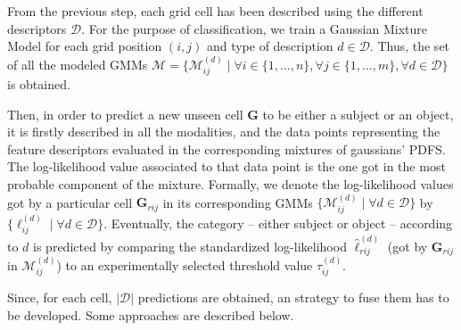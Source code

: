 \documentclass[10pt,twocolumn,letterpaper]{article}
\begin{document}
From the previous step, each grid cell has been described using the different descriptors $\mathcal{D}$. For the purpose of classification, we train a Gaussian Mixture Model for each grid position $(i,j)$ and type of description $d \in \mathcal{D}$. Thus, the set of all the modeled GMMs $\mathcal{M} = \{\mathcal{M}_{ij}^{(d)} \;|\; \forall i \in \{1,...,n\}, \forall j \in \{1,...,m\}, \forall d \in \mathcal{D} \}$ is obtained.

Then, in order to predict a new unseen cell $\mathbf{G}$ to be either a subject or an object, it is firstly described in all the modalities, and the data points representing the feature descriptors evaluated in the corresponding mixtures of gaussians' PDFS. The log-likelihood value associated to that data point is the one got in the most probable component of the mixture. Formally, we denote the log-likelihood values got by a particular cell $\mathbf{G}_{rij}$ in its corresponding GMMs $\{\mathcal{M}_{ij}^{(d)} \;|\; \forall d \in \mathcal{D}\}$ by $\{\ell_{ij}^{(d)} \;|\; \forall d \in \mathcal{D}\}$. Eventually, the category -- either subject or object -- according to $d$ is predicted by comparing the standardized log-likelihood $\hat{\ell}_{rij}^{(d)}$ (got by $\mathbf{G}_{rij}$ in $\mathcal{M}_{ij}^{(d)}$) to an experimentally selected threshold value $\tau_{ij}^{(d)}$. 

Since, for each cell, $|\mathcal{D}|$ predictions are obtained, an strategy to fuse them has to be developed. Some approaches are described below.

\end{document}
